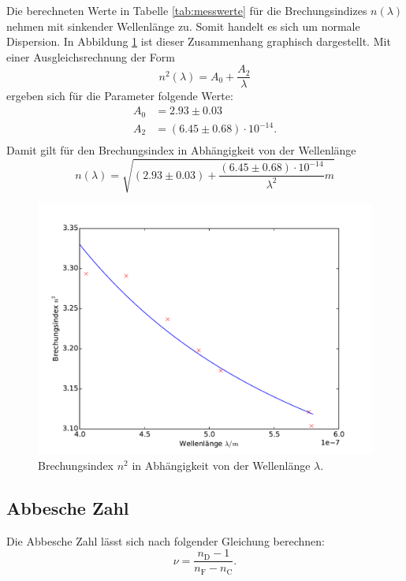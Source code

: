 Die berechneten Werte in Tabelle \ref{tab:messwerte} für die Brechungsindizes $n(\lambda)$ nehmen mit sinkender Wellenlänge zu. Somit handelt es sich um normale Dispersion.
In Abbildung \ref{fig:dispersion} ist dieser Zusammenhang graphisch dargestellt. Mit einer Ausgleichsrechnung der Form
\begin{equation}
  \label{eqn:disp}
  n^2(\lambda)= A_0 + \frac{A_2}{\lambda}
\end{equation}
ergeben sich für die Parameter folgende Werte:
\begin{align}
  A_0 &= 2.93 \pm 0.03 \nonumber \\
  A_2 &= (6.45 \pm 0.68)\cdot 10^{-14}. \nonumber \\
\end{align}
Damit gilt für den Brechungsindex in Abhängigkeit von der Wellenlänge
\begin{equation}
  \label{eqn:n}
  n(\lambda) =\sqrt{(2.93 \pm 0.03) + \frac{(6.45 \pm 0.68)\cdot10^{-14}}{\lambda^2}m}
\end{equation}

\begin{figure}
  \centering
  \includegraphics[scale=0.8]{auswertung/plot.pdf}
\caption{Brechungsindex $n^2$ in Abhängigkeit von der Wellenlänge $\lambda$.}
  \label{fig:dispersion}
\end{figure}

\subsection{Abbesche Zahl}
Die Abbesche Zahl lässt sich nach folgender Gleichung berechnen:
\begin{equation}
  \label{eqn:abbe1}
  \nu =\frac{n_\mathrm{D}-1}{n_\mathrm{F}-n_\mathrm{C}}.
\end{equation}

